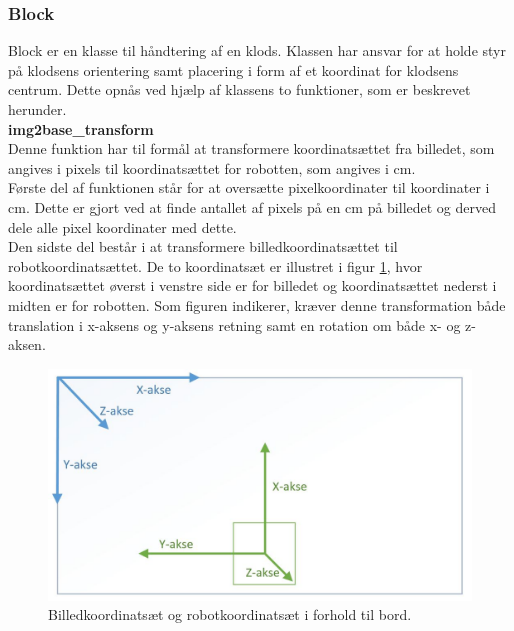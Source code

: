 \subsubsection{Block} %
\label{subsub:block}

Block er en klasse til håndtering af en klods. Klassen har ansvar for at holde styr på klodsens orientering samt placering i form af et koordinat for klodsens centrum. Dette opnås ved hjælp af klassens to funktioner, som er beskrevet herunder. \\

\textbf{img2base\_transform} \\
Denne funktion har til formål at transformere koordinatsættet fra billedet, som angives i pixels til koordinatsættet for robotten, som angives i cm.\\

Første del af funktionen står for at oversætte pixelkoordinater til koordinater i cm. Dette er gjort ved at finde antallet af pixels på en cm på billedet og derved dele alle pixel koordinater med dette. \\

Den sidste del består i at transformere billedkoordinatsættet til robotkoordinatsættet. De to koordinatsæt er illustret i figur \ref{fig:img2base}, hvor koordinatsættet øverst i venstre side er for billedet og koordinatsættet nederst i midten er for robotten. Som figuren indikerer, kræver denne transformation både translation i x-aksens og y-aksens retning samt en rotation om både x- og z-aksen. \\


\begin{figure}[H]
\centering
\includegraphics[scale=0.4]{images/img2base}
\caption{Billedkoordinatsæt og robotkoordinatsæt i forhold til bord.}
\label{fig:img2base}
\end{figure}

